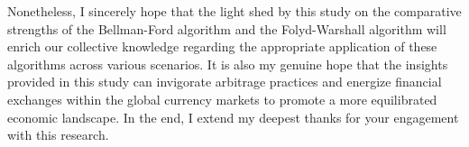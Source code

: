 \documentclass[12pt]{article}
\begin{document}
\hspace*{\fill} %

Nonetheless, I sincerely hope that the light shed by this study on the comparative strengths of the Bellman-Ford algorithm and the Folyd-Warshall algorithm will enrich our collective knowledge regarding the appropriate application of these algorithms across various scenarios. It is also my genuine hope that the insights provided in this study can invigorate arbitrage practices and energize financial exchanges within the global currency markets to promote a more equilibrated economic landscape. In the end, I extend my deepest thanks for your engagement with this research.

\clearpage %
\nocite{*}
\printbibliography
\makeatletter\def\Hy@Warning#1{}\makeatother
\renewcommand{\thefootnote}{} %


\end{document}
